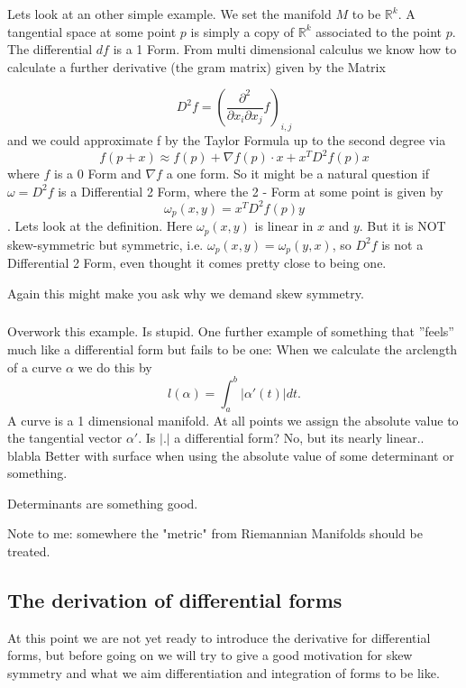 Lets look at an other simple example. We set the manifold $M$ to be $\mathbb R^k$. A tangential space  at some point $p$ is simply a copy of $\mathbb R ^k$ associated to the point $p$.
The differential $df$ is a 1 Form. From multi dimensional calculus we know how to calculate a further derivative (the gram matrix) given by the Matrix

\[D^2 f = (\frac{\partial^2}{\partial x_i \partial x_j} f)_{i,j}\]
and we could approximate f by the Taylor Formula up to the second degree via
\[f(p+x) \approx f(p) + \nabla f (p)\cdot x + x^T D^2f(p)x \]
where $f$ is a 0 Form and $\nabla f$ a one form. So it might be a natural question if $\omega = D^2f$ is a Differential 2 Form, where the 2 - Form at some point is given by
\[\omega_p(x,y) = x^T D^2f(p) y\]. 
Lets look at the definition. Here $\omega_p(x,y)$ is linear in $x$ and $y$. But it is NOT skew-symmetric but symmetric, i.e. $\omega_p(x,y) = \omega_p(y,x)$, so $D^2 f$ is not a Differential 2 Form, even thought it comes pretty close to being one.

Again this might make you ask why we demand skew symmetry.
\subsubsection*{}
Overwork this example. Is stupid.
One further example of something that ''feels'' much like a differential form but fails to be one:  When we calculate the arclength of a curve $\alpha$ we do this by
\[l(\alpha) = \int_a^b |\alpha'(t)| dt.\]
A curve is a 1 dimensional manifold. At all points we assign the absolute value to the tangential vector $\alpha'$. Is $|.|$ a differential form? No, but its nearly linear.. blabla
Better with surface when using the absolute value of some determinant or something.

Determinants are something good.

Note to me: somewhere the "metric" from Riemannian Manifolds should be treated.


\subsection{The derivation of differential forms}
At this point we are not yet ready to introduce the derivative for differential forms, but before going on we will try to give a good motivation for skew symmetry and what we aim differentiation and integration of forms to be like.

